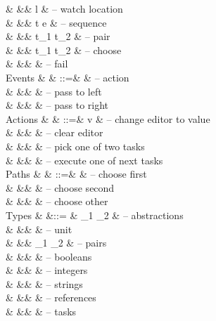 \begin{grammar}
    &        &\mid& \Watch l                    & – watch location \\
    &        &\mid& t \Seq e                    & – sequence \\
    &        &\mid& t_1 \And t_2                & – pair \\
    &        &\mid& t_1 \Or t_2                 & – choose \\
    &        &\mid& \Fail                       & – fail \\
  Events
    & \eta   & ::=& \alpha                      & – action \\
    &        &\mid& \Left \eta                  & – pass to left \\
    &        &\mid& \Right \eta                 & – pass to right \\
  Actions
    & \alpha & ::=& v                           & – change editor to value \\
    &        &\mid& \Clear                      & – clear editor \\
    &        &\mid& \Pick \pi                   & – pick one of two tasks \\
    &        &\mid& \Execute \pi                & – execute one of next tasks \\
  Paths
    & \pi    & ::=& \First                      & – choose first \\
    &        &\mid& \Second                     & – choose second \\
    &        &\mid& \Other \pi                  & – choose other \\
  Types
    & \tau   &::= & \tau_1 \to \tau_2           & – abstractions \\
    &        &\mid& \Unit                       & – unit \\
    &        &\mid& \tau_1 \times \tau_2        & – pairs \\
    &        &\mid& \Bool                       & – booleans \\
    &        &\mid& \Int                        & – integers \\
    &        &\mid& \String                     & – strings \\
    &        &\mid& \Reference \tau             & – references \\
    &        &\mid& \Task \tau                  & – tasks \\
\end{grammar}


\renewcommand*{\arraystretch}{4}
\statefultrue


